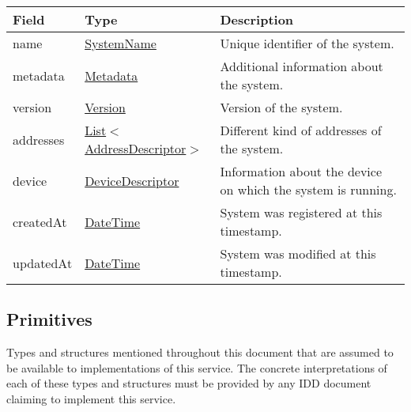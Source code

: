 \documentclass[a4paper]{arrowhead}
\newcommand{\pref}[1]{{\textcolor{ArrowheadGrey}{\hyperref[sec:model:primitives:#1]{#1}}}}
\begin{document}
\begin{table}[ht!]
\begin{tabularx}{\textwidth}{| p{4.25cm} | p{4cm} | X |} \hline
\rowcolor{gray!33} Field & Type      & Description \\ \hline
name & \pref{SystemName} & Unique identifier of the system. \\ \hline
metadata & \hyperref[sec:model:Metadata]{Metadata} & Additional information about the system. \\ \hline
version & \pref{Version} & Version of the system. \\ \hline
addresses &  \pref{List}$<$\hyperref[sec:model:AddressDescriptor]{AddressDescriptor}$>$ & Different kind of addresses of the system.  \\ \hline
device & \hyperref[sec:model:DeviceDescriptor]{DeviceDescriptor} & Information about the device on which the system is running. \\ \hline
createdAt & \pref{DateTime} & System was registered at this timestamp. \\ \hline
updatedAt & \pref{DateTime} & System was modified at this timestamp. \\ \hline
\end{tabularx}
\end{table}

\subsection{Primitives}
\label{sec:model:primitives}

Types and structures mentioned throughout this document that are assumed to be available to implementations of this service.
The concrete interpretations of each of these types and structures must be provided by any IDD document claiming to implement this service.
\end{document}
